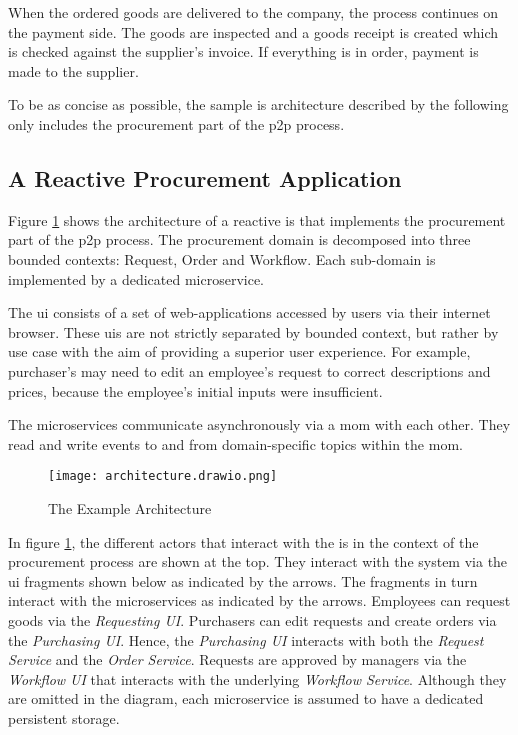 When the ordered goods are delivered to the company, the process continues on the payment side.
The goods are inspected and a goods receipt is created which is checked against the supplier's invoice.
If everything is in order, payment is made to the supplier.

To be as concise as possible, the sample \gls{is} architecture described by the following only includes the procurement part of the \gls{p2p} process.

\subsection{A Reactive Procurement Application}

Figure \ref{fig:example-architecture} shows the architecture of a reactive \gls{is} that implements the procurement part of the \gls{p2p} process.
The procurement domain is decomposed into three bounded contexts: Request, Order and Workflow.
Each sub-domain is implemented by a dedicated microservice.

The \gls{ui} consists of a set of web-applications accessed by users via their internet browser.
These \glspl{ui} are not strictly separated by bounded context, but rather by use case with the aim of providing a superior user experience.
For example, purchaser's may need to edit an employee's request to correct descriptions and prices, because the employee's initial inputs were insufficient.

The microservices communicate asynchronously via a \gls{mom} with each other.
They read and write events to and from domain-specific topics within the \gls{mom}.

\begin{figure}[H]
  \centering
  \texttt{[image: architecture.drawio.png]}
  \caption{The Example Architecture}\label{fig:example-architecture}
\end{figure}

In figure \ref{fig:example-architecture}, the different actors that interact with the \gls{is} in the context of the procurement process are shown at the top.
They interact with the system via the \gls{ui} fragments shown below as indicated by the arrows.
The fragments in turn interact with the microservices as indicated by the arrows.
Employees can request goods via the \emph{Requesting UI}.
Purchasers can edit requests and create orders via the \emph{Purchasing UI}.
Hence, the \emph{Purchasing UI} interacts with both the \emph{Request Service} and the \emph{Order Service}.
Requests are approved by managers via the \emph{Workflow UI} that interacts with the underlying \emph{Workflow Service}.
Although they are omitted in the diagram, each microservice is assumed to have a dedicated persistent storage.

